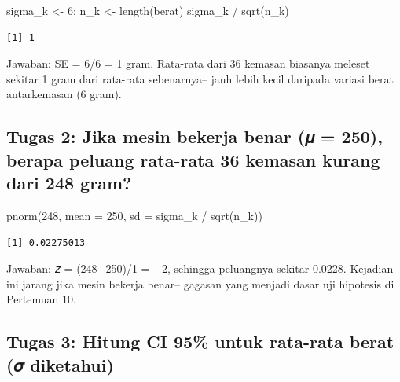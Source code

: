 \documentclass[
  indonesian,
  letterpaper,
]{book}
\newenvironment{Shaded}{\begin{snugshade}}{\end{snugshade}}
\newcommand{\AttributeTok}[1]{\textcolor[rgb]{0.40,0.45,0.13}{#1}}
\newcommand{\DecValTok}[1]{\textcolor[rgb]{0.68,0.00,0.00}{#1}}
\newcommand{\FunctionTok}[1]{\textcolor[rgb]{0.28,0.35,0.67}{#1}}
\newcommand{\NormalTok}[1]{\textcolor[rgb]{0.00,0.23,0.31}{#1}}
\newcommand{\OtherTok}[1]{\textcolor[rgb]{0.00,0.23,0.31}{#1}}
\newcommand{\SpecialCharTok}[1]{\textcolor[rgb]{0.37,0.37,0.37}{#1}}
\begin{document}
\begin{Shaded}
\begin{Highlighting}[]
\NormalTok{sigma\_k }\OtherTok{\textless{}{-}} \DecValTok{6}\NormalTok{; n\_k }\OtherTok{\textless{}{-}} \FunctionTok{length}\NormalTok{(berat)}
\NormalTok{sigma\_k }\SpecialCharTok{/} \FunctionTok{sqrt}\NormalTok{(n\_k)}
\end{Highlighting}
\end{Shaded}

\begin{verbatim}
[1] 1
\end{verbatim}

Jawaban: SE = 6/6 = 1 gram. Rata-rata dari 36 kemasan biasanya meleset
sekitar 1 gram dari rata-rata sebenarnya-- jauh lebih kecil daripada
variasi berat antarkemasan (6 gram).

\subsection{Tugas 2: Jika mesin bekerja benar (𝜇 = 250), berapa peluang
rata-rata 36 kemasan kurang dari 248
gram?}\label{tugas-2-jika-mesin-bekerja-benar-ux1d707-250-berapa-peluang-rata-rata-36-kemasan-kurang-dari-248-gram}

\begin{Shaded}
\begin{Highlighting}[]
\FunctionTok{pnorm}\NormalTok{(}\DecValTok{248}\NormalTok{, }\AttributeTok{mean =} \DecValTok{250}\NormalTok{, }\AttributeTok{sd =}\NormalTok{ sigma\_k }\SpecialCharTok{/} \FunctionTok{sqrt}\NormalTok{(n\_k))}
\end{Highlighting}
\end{Shaded}

\begin{verbatim}
[1] 0.02275013
\end{verbatim}

Jawaban: 𝑧 = (248−250)/1 = −2, sehingga peluangnya sekitar 0.0228.
Kejadian ini jarang jika mesin bekerja benar-- gagasan yang menjadi
dasar uji hipotesis di Pertemuan 10.

\subsection{Tugas 3: Hitung CI 95\% untuk rata-rata berat (𝜎
diketahui)}\label{tugas-3-hitung-ci-95-untuk-rata-rata-berat-ux1d70e-diketahui}
\end{document}
